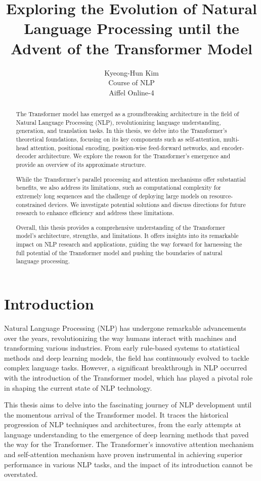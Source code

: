 \documentclass{article}
\title{Exploring the Evolution of Natural Language Processing until the Advent of the Transformer Model}
\author{%
  Kyeong-Hun Kim\\
  Course of NLP\\
  Aiffel Online-4\\
}
\begin{document}
\maketitle


\begin{abstract}
  
    The Transformer model has emerged as a groundbreaking architecture in the field of Natural Language Processing (NLP), revolutionizing language understanding, generation, and translation tasks. In this thesis, we delve into the Transformer's theoretical foundations, focusing on its key components such as self-attention, multi-head attention, positional encoding, position-wise feed-forward networks, and encoder-decoder architecture. We explore the reason for the Transformer's emergence and provide an overview of its approximate structure.

    While the Transformer's parallel processing and attention mechanisms offer substantial benefits, we also address its limitations, such as computational complexity for extremely long sequences and the challenge of deploying large models on resource-constrained devices. We investigate potential solutions and discuss directions for future research to enhance efficiency and address these limitations.
    
    Overall, this thesis provides a comprehensive understanding of the Transformer model's architecture, strengths, and limitations. It offers insights into its remarkable impact on NLP research and applications, guiding the way forward for harnessing the full potential of the Transformer model and pushing the boundaries of natural language processing.
\end{abstract}


\section{Introduction}


Natural Language Processing (NLP) has undergone remarkable advancements over the years, revolutionizing the way humans interact with machines and transforming various industries. From early rule-based systems to statistical methods and deep learning models, the field has continuously evolved to tackle complex language tasks. However, a significant breakthrough in NLP occurred with the introduction of the Transformer model, which has played a pivotal role in shaping the current state of NLP technology.

This thesis aims to delve into the fascinating journey of NLP development until the momentous arrival of the Transformer model. It traces the historical progression of NLP techniques and architectures, from the early attempts at language understanding to the emergence of deep learning methods that paved the way for the Transformer. The Transformer's innovative attention mechanism and self-attention mechanism have proven instrumental in achieving superior performance in various NLP tasks, and the impact of its introduction cannot be overstated.
\end{document}
